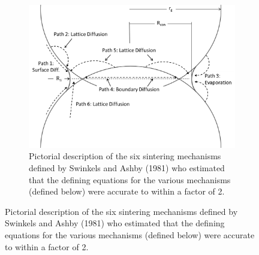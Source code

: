 \documentclass[11pt]{article} %
\begin{document}
\begin{figure}[ht]
\begin{Table}
	
	\begin{figure}
	\centering
	\includegraphics[scale=0.5]{Swinkels1981_DiffMech.png}
	\caption{Pictorial description of the six sintering mechanisms defined by Swinkels and Ashby (1981) who estimated that the defining equations for the various mechanisms (defined below) were accurate to within a factor of 2.}
	\label{fig:diffmech}
	\end{figure}
	

\end{Table}
\end{figure}
\end{document}

